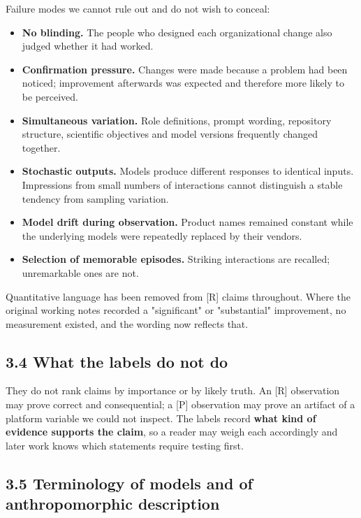 Failure modes we cannot rule out and do not wish to conceal:

\begin{itemize}
  \item \textbf{No blinding.} The people who designed each organizational change also judged whether it had worked.
  \item \textbf{Confirmation pressure.} Changes were made because a problem had been noticed; improvement afterwards was expected and therefore more likely to be perceived.
  \item \textbf{Simultaneous variation.} Role definitions, prompt wording, repository structure, scientific objectives and model versions frequently changed together.
  \item \textbf{Stochastic outputs.} Models produce different responses to identical inputs. Impressions from small numbers of interactions cannot distinguish a stable tendency from sampling variation.
  \item \textbf{Model drift during observation.} Product names remained constant while the underlying models were repeatedly replaced by their vendors.
  \item \textbf{Selection of memorable episodes.} Striking interactions are recalled; unremarkable ones are not.
\end{itemize}
Quantitative language has been removed from [R] claims throughout. Where the original working notes recorded a "significant" or "substantial" improvement, no measurement existed, and the wording now reflects that.


\subsection*{3.4 What the labels do not do}
\label{sec:en:3.4}

They do not rank claims by importance or by likely truth. An [R] observation may prove correct and consequential; a [P] observation may prove an artifact of a platform variable we could not inspect. The labels record \textbf{what kind of evidence supports the claim}, so a reader may weigh each accordingly and later work knows which statements require testing first.


\subsection*{3.5 Terminology of models and of anthropomorphic description}
\label{sec:en:3.5}

